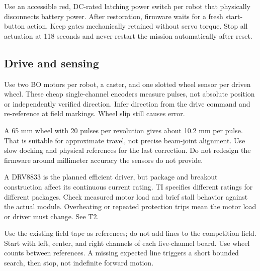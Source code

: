 \documentclass[10pt,a4paper]{article}
\begin{document}
Use an accessible red, DC-rated latching power switch per robot that physically disconnects battery power. After restoration, firmware waits for a fresh start-button action. Keep gates mechanically retained without servo torque. Stop all actuation at 118 seconds and never restart the mission automatically after reset.

\subsection{Drive and sensing}
Use two BO motors per robot, a caster, and one slotted wheel sensor per driven wheel. These cheap single-channel encoders measure pulses, not absolute position or independently verified direction. Infer direction from the drive command and re-reference at field markings. Wheel slip still causes error.

A 65 mm wheel with 20 pulses per revolution gives about 10.2 mm per pulse. That is suitable for approximate travel, not precise beam-joint alignment. Use slow docking and physical references for the last correction. Do not redesign the firmware around millimeter accuracy the sensors do not provide.

A DRV8833 is the planned efficient driver, but package and breakout construction affect its continuous current rating. TI specifies different ratings for different packages. Check measured motor load and brief stall behavior against the actual module. Overheating or repeated protection trips mean the motor load or driver must change. See T2.

Use the existing field tape as references; do not add lines to the competition field. Start with left, center, and right channels of each five-channel board. Use wheel counts between references. A missing expected line triggers a short bounded search, then stop, not indefinite forward motion.
\end{document}
